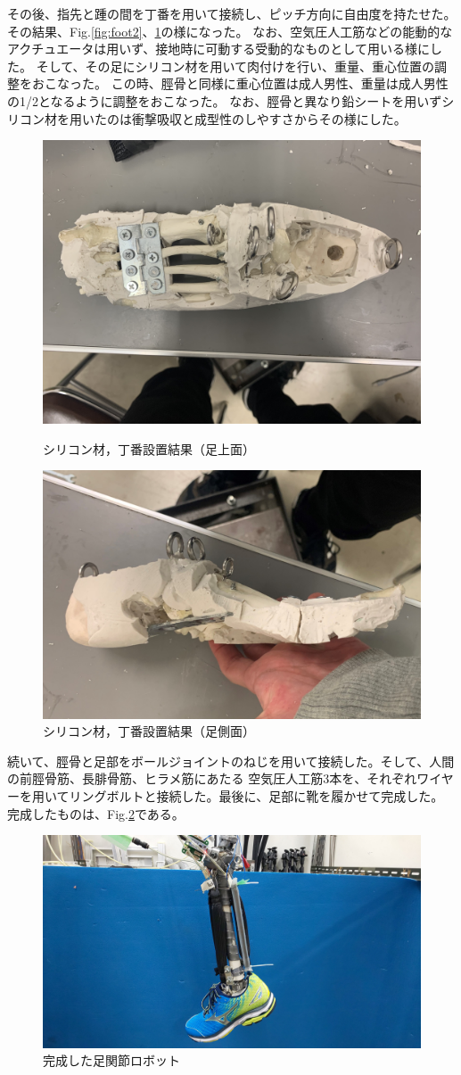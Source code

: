 その後、指先と踵の間を丁番を用いて接続し、ピッチ方向に自由度を持たせた。その結果、Fig.\ref{fig:foot2}、\ref{fig:footside2}の様になった。
なお、空気圧人工筋などの能動的なアクチュエータは用いず、接地時に可動する受動的なものとして用いる様にした。
そして、その足にシリコン材を用いて肉付けを行い、重量、重心位置の調整をおこなった。
この時、脛骨と同様に重心位置は成人男性、重量は成人男性の1/2となるように調整をおこなった。
なお、脛骨と異なり鉛シートを用いずシリコン材を用いたのは衝撃吸収と成型性のしやすさからその様にした。
\newpage
\begin{figure}[h]
    \begin{center}
     \includegraphics[width=0.6\columnwidth,clip]{./2_measurement/siliconfoot.eps}
     \caption{シリコン材，丁番設置結果（足上面）}
     \label{fig:foot2}
    \end{center}
    \begin{center}
     \includegraphics[width=0.6\columnwidth,clip]{./2_measurement/siliconfootside.eps}
     \caption{シリコン材，丁番設置結果（足側面）}
     \label{fig:footside2}
    \end{center}
\end{figure}

続いて、脛骨と足部をボールジョイントのねじを用いて接続した。そして、人間の前脛骨筋、長腓骨筋、ヒラメ筋にあたる
空気圧人工筋3本を、それぞれワイヤーを用いてリングボルトと接続した。最後に、足部に靴を履かせて完成した。
完成したものは、Fig.\ref{fig:legPb}である。

\begin{figure}[h]
    \begin{center}
     \includegraphics[width=0.75\columnwidth,clip]{./2_measurement/fin.eps}
     \caption{完成した足関節ロボット}
     \label{fig:legPb}
    \end{center}
\end{figure}